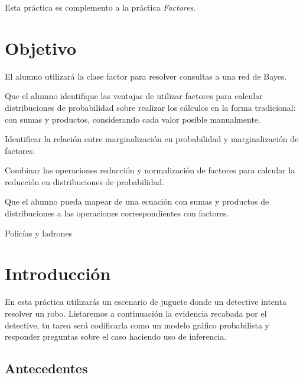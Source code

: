 
Esta práctica es complemento a la práctica \emph{Factores}.

\section{Objetivo}

El alumno utilizará la clase factor para resolver consultas a una red de Bayes.

\begin{compactitem}
 \item Que el alumno identifique las ventajas de utilizar factores para calcular distribuciones de probabilidad sobre realizar los cálculos en la forma tradicional: con sumas y productos, considerando cada valor posible manualmente.
 
 \item Identificar la relación entre marginalización en probabilidad y marginalización de factores.
 
 \item Combinar las operaciones reducción y normalización de factores para calcular la reducción en distribuciones de probabilidad.
 
 \item Que el alumno pueda mapear de una ecuación con sumas y productos de distribuciones a las operaciones correspondientes con factores.
\end{compactitem}

\begin{auxcode}
 \caption{Policías y ladrones}
 \centering
\end{auxcode}


\section{Introducción}

En esta práctica utilizarás un escenario de juguete donde un detective intenta resolver un robo.  Listaremos a continuación la evidencia recabada por el detective, tu tarea será codificarla como un modelo gráfico probabilista y responder preguntas sobre el caso haciendo uso de inferencia.

\subsection{Antecedentes}

